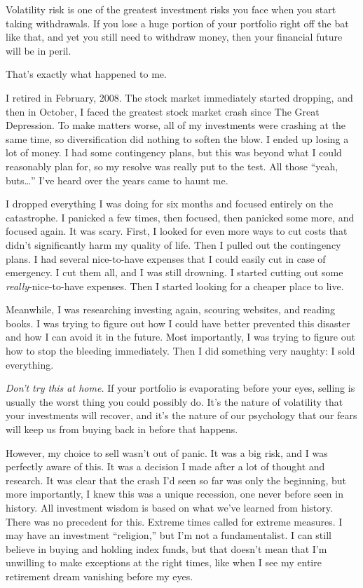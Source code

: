 Volatility risk is one of the greatest investment risks you face when you start taking withdrawals. If you lose a huge portion of your portfolio right off the bat like that, and yet you still need to withdraw money, then your financial future will be in peril.

That's exactly what happened to me.

I retired in February, 2008. The stock market immediately started dropping, and then in October, I faced the greatest stock market crash since The Great Depression. To make matters worse, all of my investments were crashing at the same time, so diversification did nothing to soften the blow. I ended up losing a lot of money. I had some contingency plans, but this was beyond what I could reasonably plan for, so my resolve was really put to the test. All those ``yeah, buts\ldots'' I've heard over the years came to haunt me.

I dropped everything I was doing for six months and focused entirely on the catastrophe. I panicked a few times, then focused, then panicked some more, and focused again. It was scary. First, I looked for even more ways to cut costs that didn't significantly harm my quality of life. Then I pulled out the contingency plans. I had several nice-to-have expenses that I could easily cut in case of emergency. I cut them all, and I was still drowning. I started cutting out some \emph{really}-nice-to-have expenses. Then I started looking for a cheaper place to live.

Meanwhile, I was researching investing again, scouring websites, and reading books. I was trying to figure out how I could have better prevented this disaster and how I can avoid it in the future. Most importantly, I was trying to figure out how to stop the bleeding immediately. Then I did something very naughty: I sold everything.

\emph{Don't try this at home.} If your portfolio is evaporating before your eyes, selling is usually the worst thing you could possibly do. It's the nature of volatility that your investments will recover, and it's the nature of our psychology that our fears will keep us from buying back in before that happens.

However, my choice to sell wasn't out of panic. It was a big risk, and I was perfectly aware of this. It was a decision I made after a lot of thought and research. It was clear that the crash I'd seen so far was only the beginning, but more importantly, I knew this was a unique recession, one never before seen in history. All investment wisdom is based on what we've learned from history. There was no precedent for this. Extreme times called for extreme measures. I may have an investment ``religion,'' but I'm not a fundamentalist. I can still believe in buying and holding index funds, but that doesn't mean that I'm unwilling to make exceptions at the right times, like when I see my entire retirement dream vanishing before my eyes.

